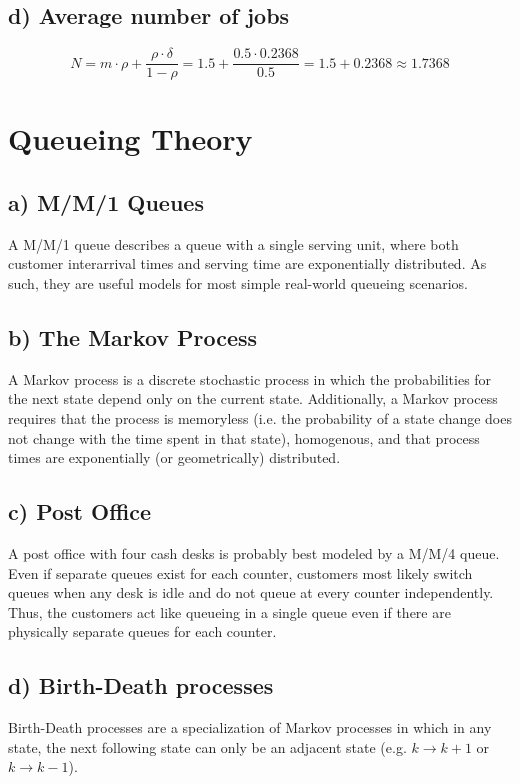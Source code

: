 \documentclass[a4paper, 11 pt, article, accentcolor=tud7b]{tudreport}
\begin{document}
	\subsection*{d) Average number of jobs}
	$$N = m \cdot \rho + \frac{\rho \cdot \delta}{1 - \rho} = 1.5 + \frac{0.5 \cdot 0.2368}{0.5} = 1.5 + 0.2368 \approx 1.7368$$
	
	\section{Queueing Theory}
	
	\subsection*{a) M/M/1 Queues}
	A M/M/1 queue describes a queue with a single serving unit, where both customer interarrival times and serving time are exponentially distributed. As such, they are useful models for most simple real-world queueing scenarios.
	
	\subsection*{b) The Markov Process}
	A Markov process is a discrete stochastic process in which the probabilities for the next state depend only on the current state. Additionally, a Markov process requires that the process is memoryless (i.e. the probability of a state change does not change with the time spent in that state), homogenous, and that process times are exponentially (or geometrically) distributed.
	
	\subsection*{c) Post Office}
	A post office with four cash desks is probably best modeled by a M/M/4 queue. Even if separate queues exist for each counter, customers most likely switch queues when any desk is idle and do not queue at every counter independently. Thus, the customers act like queueing in a single queue even if there are physically separate queues for each counter.
	
	\subsection*{d) Birth-Death processes}
	Birth-Death processes are a specialization of Markov processes in which in any state, the next following state can only be an adjacent state (e.g. $k \rightarrow k+1$ or $k \rightarrow k-1$).
	
\end{document}
